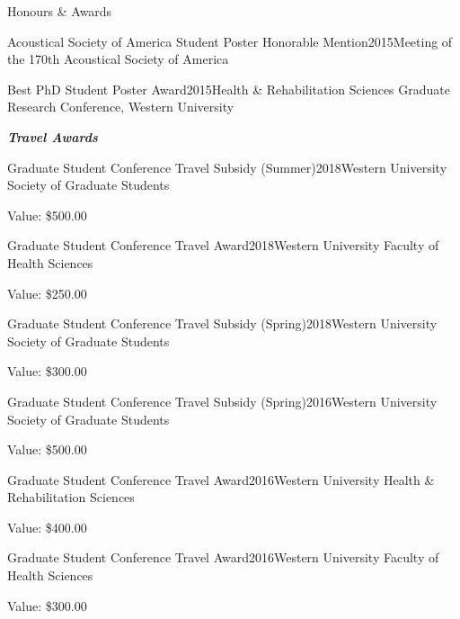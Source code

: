 \documentclass{resume} %
\begin{document}
\begin{rSection}{Honours \& Awards}
\begin{rSubsection}{Acoustical Society of America Student Poster Honorable Mention}{2015}{Meeting of the 170th Acoustical Society of America}{}
\end{rSubsection}

\begin{rSubsection}{Best PhD Student Poster Award}{2015}{Health \& Rehabilitation Sciences Graduate Research Conference, Western University}{}
\end{rSubsection}

\begin{center}
	{\bf \emph{Travel Awards}}
\end{center}

\begin{rSubsection}{Graduate Student Conference Travel Subsidy (Summer)}{2018}{Western University Society of Graduate Students}{}
	\item Value: \$500.00
\end{rSubsection}

\begin{rSubsection}{Graduate Student Conference Travel Award}{2018}{Western University Faculty of Health Sciences}{}
	\item Value: \$250.00
\end{rSubsection}

\begin{rSubsection}{Graduate Student Conference Travel Subsidy (Spring)}{2018}{Western University Society of Graduate Students}{}
	\item Value: \$300.00
\end{rSubsection}

\begin{rSubsection}{Graduate Student Conference Travel Subsidy (Spring)}{2016}{Western University Society of Graduate Students}{}
	\item Value: \$500.00
\end{rSubsection}

\begin{rSubsection}{Graduate Student Conference Travel Award}{2016}{Western University Health \& Rehabilitation Sciences}{}
	\item Value: \$400.00
\end{rSubsection}

\begin{rSubsection}{Graduate Student Conference Travel Award}{2016}{Western University Faculty of Health Sciences}{}
	\item Value: \$300.00
\end{rSubsection}



%


\end{rSection}
\end{document}

